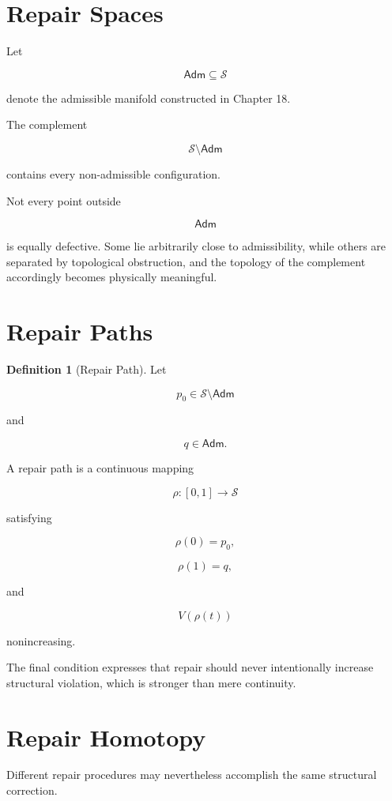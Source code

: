 \documentclass[11pt,oneside]{book}
\numberwithin{equation}{chapter}
\theoremstyle{definition}
\newtheorem{definition}{Definition}[chapter]
\theoremstyle{plain}
\newcommand{\State}{\mathcal{S}}
\newcommand{\Adm}{\mathsf{Adm}}
\begin{document}
\section{Repair Spaces}

Let

\[
\Adm
\subseteq
\State
\]

denote the admissible manifold constructed in Chapter 18.

The complement

\[
\State\setminus\Adm
\]

contains every non-admissible configuration.

Not every point outside

\[
\Adm
\]

is equally defective. Some lie arbitrarily close to admissibility, while others are separated by topological obstruction, and the topology of the complement accordingly becomes physically meaningful.

\section{Repair Paths}

\begin{definition}[Repair Path]

Let

\[
p_0
\in
\State\setminus\Adm
\]

and

\[
q
\in
\Adm.
\]

A repair path is a continuous mapping

\[
\rho :
[0,1]
\rightarrow
\State
\]

satisfying

\[
\rho(0)=p_0,
\]

\[
\rho(1)=q,
\]

and

\[
V(\rho(t))
\]

nonincreasing.

\end{definition}

The final condition expresses that repair should never intentionally increase structural violation, which is stronger than mere continuity.

\section{Repair Homotopy}

Different repair procedures may nevertheless accomplish the same structural
correction.
\end{document}
